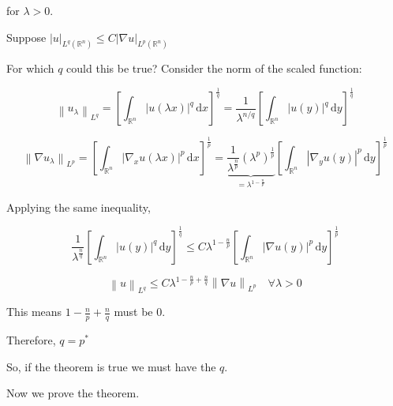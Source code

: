 \documentclass{article}
\theoremstyle{definition}
\begin{document}
for \(\lambda > 0\).

Suppose \(\left\vert u \right\vert _{L^q(\mathbb{R}^n)} \leq C \left\vert \nabla u \right\vert _{L^p(\mathbb{R}^n)}\) 

For which \(q\) could this be true? Consider the norm of the scaled function:

\[
    \left\lVert u_\lambda  \right\rVert _{L^q} = \left[ \int_{\mathbb{R} ^n}^{} \vert u(\lambda x) \vert ^ q \,\mathrm{d}x  \right] ^ {\frac{1}{q}} = \frac{1}{\lambda ^{n / q}} \left[ \int_{\mathbb{R}^n}^{} \vert u(y) \vert ^ q \,\mathrm{d}y  \right] ^{\frac{1}{q}}
\]

\[
    \left\lVert \nabla u_\lambda \right\rVert _{L^p} = \left[ \int_{\mathbb{R} ^n}^{} \vert \nabla_x u(\lambda x) \vert ^ p \,\mathrm{d}x  \right] ^{\frac{1}{p}} = \underbrace{\frac{1}{\lambda ^{\frac{n}{p}}} (\lambda ^ p)^{\frac{1}{p}}}_{=\lambda^{1-\frac{n}{p}}} \left[ \int_{\mathbb{R} ^n}^{} \left\vert \nabla _y u(y) \right\vert ^p \,\mathrm{d}y  \right] ^{\frac{1}{p}}
\]

Applying the same inequality,

\[
    \frac{1}{\lambda^{\frac{n}{q}}} \left[ \int_{\mathbb{R} ^n}^{} \vert u(y) \vert ^q \,\mathrm{d}y  \right]^{\frac{1}{q}} \leq C \lambda^{1 - \frac{n}{p}} \left[ \int_{\mathbb{R} ^n}^{} \vert \nabla u(y) \vert ^p \,\mathrm{d}y  \right] ^{\frac{1}{p}} 
\]

\[
    \left\lVert u \right\rVert _{L^q} \leq C \lambda ^{1 - \frac{n}{p} + \frac{n}{q}} \left\lVert \nabla u \right\rVert _{L^p} \quad \forall \lambda > 0
\]

This means \(1 - \frac{n}{p} + \frac{n}{q}\) must be \(0\).

Therefore, \(q = p^{\ast} \) 

So, if the theorem is true we must have the \(q\).

Now we prove the theorem.
\end{document}
